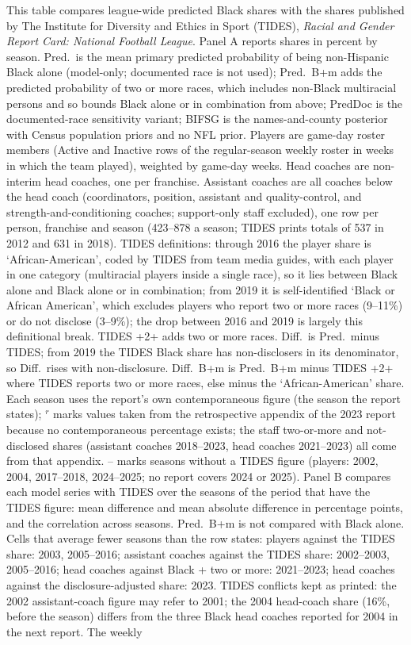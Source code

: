 \begin{table}[!h]
{\begin{threeparttable}
\begin{tablenotes}[para]
\item This table compares league-wide predicted Black shares with the shares published by The Institute for Diversity and Ethics in Sport (TIDES), \textit{Racial and Gender Report Card: National Football League}. Panel A reports shares in percent by season. Pred.\ is the mean primary predicted probability of being non-Hispanic Black alone (model-only; documented race is not used); Pred.\ B+m adds the predicted probability of two or more races, which includes non-Black multiracial persons and so bounds Black alone or in combination from above; PredDoc is the documented-race sensitivity variant; BIFSG is the names-and-county posterior with Census population priors and no NFL prior. Players are game-day roster members (Active and Inactive rows of the regular-season weekly roster in weeks in which the team played), weighted by game-day weeks. Head coaches are non-interim head coaches, one per franchise. Assistant coaches are all coaches below the head coach (coordinators, position, assistant and quality-control, and strength-and-conditioning coaches; support-only staff excluded), one row per person, franchise and season (423--878 a season; TIDES prints totals of 537 in 2012 and 631 in 2018). TIDES definitions: through 2016 the player share is `African-American', coded by TIDES from team media guides, with each player in one category (multiracial players inside a single race), so it lies between Black alone and Black alone or in combination; from 2019 it is self-identified `Black or African American', which excludes players who report two or more races (9--11\%) or do not disclose (3--9\%); the drop between 2016 and 2019 is largely this definitional break. TIDES +2+ adds two or more races. Diff.\ is Pred.\ minus TIDES; from 2019 the TIDES Black share has non-disclosers in its denominator, so Diff.\ rises with non-disclosure. Diff.\ B+m is Pred.\ B+m minus TIDES +2+ where TIDES reports two or more races, else minus the `African-American' share. Each season uses the report's own contemporaneous figure (the season the report states); $^{r}$ marks values taken from the retrospective appendix of the 2023 report because no contemporaneous percentage exists; the staff two-or-more and not-disclosed shares (assistant coaches 2018--2023, head coaches 2021--2023) all come from that appendix. -- marks seasons without a TIDES figure (players: 2002, 2004, 2017--2018, 2024--2025; no report covers 2024 or 2025). Panel B compares each model series with TIDES over the seasons of the period that have the TIDES figure: mean difference and mean absolute difference in percentage points, and the correlation across seasons. Pred.\ B+m is not compared with Black alone. Cells that average fewer seasons than the row states: players against the TIDES share: 2003, 2005--2016; assistant coaches against the TIDES share: 2002--2003, 2005--2016; head coaches against Black + two or more: 2021--2023; head coaches against the disclosure-adjusted share: 2023. TIDES conflicts kept as printed: the 2002 assistant-coach figure may refer to 2001; the 2004 head-coach share (16\%, before the season) differs from the three Black head coaches reported for 2004 in the next report. The weekly 
\end{tablenotes}
\end{threeparttable}}
\end{table}
